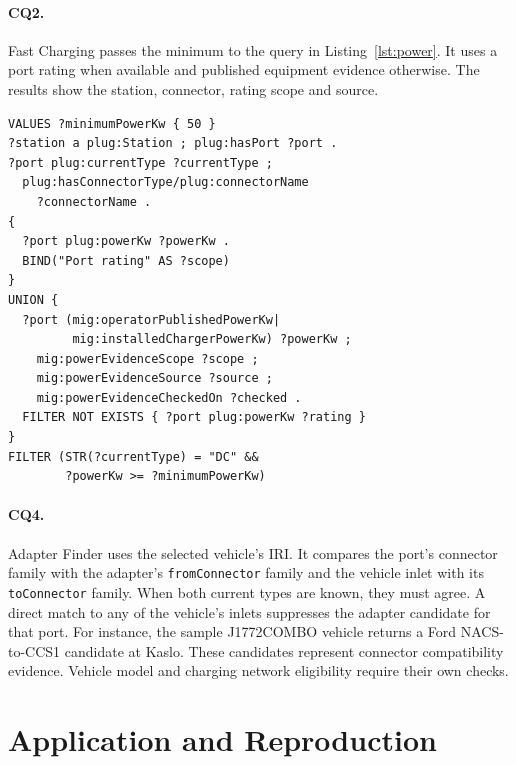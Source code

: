 \documentclass[sigconf,nonacm]{acmart}
\begin{document}
\paragraph{CQ2.}
Fast Charging passes the minimum to the query in Listing~\ref{lst:power}. It uses a port rating when available and published equipment evidence otherwise. The results show the station, connector, rating scope and source.

\begin{lstlisting}[caption={Power and current conditions inside the CQ2 graph pattern.},label={lst:power}]
VALUES ?minimumPowerKw { 50 }
?station a plug:Station ; plug:hasPort ?port .
?port plug:currentType ?currentType ;
  plug:hasConnectorType/plug:connectorName
    ?connectorName .
{
  ?port plug:powerKw ?powerKw .
  BIND("Port rating" AS ?scope)
}
UNION {
  ?port (mig:operatorPublishedPowerKw|
         mig:installedChargerPowerKw) ?powerKw ;
    mig:powerEvidenceScope ?scope ;
    mig:powerEvidenceSource ?source ;
    mig:powerEvidenceCheckedOn ?checked .
  FILTER NOT EXISTS { ?port plug:powerKw ?rating }
}
FILTER (STR(?currentType) = "DC" &&
        ?powerKw >= ?minimumPowerKw)
\end{lstlisting}

\paragraph{CQ4.}
Adapter Finder uses the selected vehicle's IRI. It compares the port's connector family with the adapter's \texttt{fromConnector} family and the vehicle inlet with its \texttt{toConnector} family. When both current types are known, they must agree. A direct match to any of the vehicle's inlets suppresses the adapter candidate for that port. For instance, the sample J1772COMBO vehicle returns a Ford NACS-to-CCS1 candidate at Kaslo. These candidates represent connector compatibility evidence. Vehicle model and charging network eligibility require their own checks.

\balance
\section{Application and Reproduction}
\end{document}
